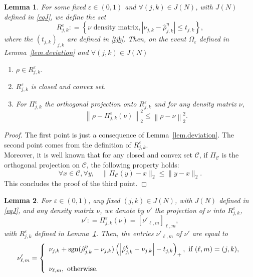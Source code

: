 \documentclass[a4paper]{amsart}
\newtheorem{lemma}{Lemma}[section]
\newcommand{\deq}{\mathrel{\mathop:} = } %
\begin{document}
\begin{lemma}
           \label{lem.projection}
            For some fixed $\varepsilon\in(0,1)$ and $\forall(j,k)\in J(N)$,
with $J(N)$ defined in \eqref{eqJ}, we define the set
            $$
             R_{j,k}^{\varepsilon}\deq \left\{ \nu \text{ density matrix},
|\nu_{j,k} - \hat{\rho}^\eta_{j,k}| \leq t_{j,k} \right\},
            $$
            where the $( t_{j,k})_{j,k}$ are defined in \eqref{tjk}. Then, on
the event $\Omega_{\varepsilon}$ defined in Lemma~\ref{lem.deviation} and
$\forall (j,k)\in J(N)$
          \begin{enumerate}
             \item $\rho\in R_{j,k}^{\varepsilon}$.
             \item $R_{j,k}^{\varepsilon}$ is closed and convex set.
             \item For $\Pi_{j,k}^{\varepsilon} $ the orthogonal projection onto
$ R_{j,k}^{\varepsilon}$ and for any density matrix $\nu$,
                 \begin{equation}
                   \label{eq.improv}
                   \left\|\rho - \Pi_{j,k}^{\varepsilon}(\nu) \right\|^{2}_{2} 
\leq \left\|\rho - \nu \right\|^{2}_{2} .
                 \end{equation}
         \end{enumerate}
\end{lemma}

\begin{proof}
The first point is just a consequence of Lemma~\ref{lem.deviation}. The second
point  comes from the definition of $R_{j,k}^{\varepsilon}$. \\
Moreover, it is well known that for any closed and convex set $\mathcal{C}$, if
$\Pi_{\mathcal{C}}$ is the orthogonal projection on $\mathcal{C}$, the following
property holds:
$$ 
\forall x\in\mathcal{C} ,\forall y,\quad \|\Pi_{\mathcal{C}}(y) - x \|_2 \leq
\|y-x\|_2 . 
$$
This concludes the proof of the third point.
\end{proof}

\begin{lemma}
          \label{lem.formule}
          For $\varepsilon\in(0,1)$, any fixed $(j,k)\in J(N)$, with $J(N)$
defined in \eqref{eqJ}, and any density matrix $\nu$, we denote by $\nu'$ the
projection of $\nu$ into $R_{j,k}^{\varepsilon}$,
          $$
          \nu' \deq \Pi_{j,k}^{\varepsilon}(\nu)=[\nu'_{\ell,m}]_{\ell,m},
          $$
          with $R_{j,k}^{\varepsilon}$ defined in Lemma~\ref{lem.projection}.
Then, the entries $\nu'_{\ell,m}$  of $\nu'$ are equal to
          $$
          \nu'_{\ell,m} =\left\{
          \begin{array}{l}
          \nu_{j,k} + {\rm sgn} (\hat{\rho}_{j,k}^{\eta} -
\nu_{j,k})\left(\left|\hat{\rho}_{j,k}^{\eta} -
\nu_{j,k}\right|-t_{j,k}\right)_{+},\text{ if } (\ell,m)=(j,k),\\\\
          \nu_{\ell,m}, \text{ otherwise.}
           \end{array}\right.
           $$
\end{lemma}
\end{document}
